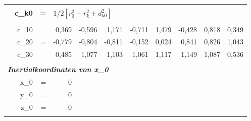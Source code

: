 \begin{table}[ht]
\begin{tabular}{r|rrr|r|r|r|r|rrr}
    \multicolumn{1}{r}{} &       &       & \multicolumn{1}{r}{} & \multicolumn{1}{r}{} & \multicolumn{1}{r}{} & \multicolumn{1}{r}{} & \multicolumn{1}{r}{} &       &       &  \\
    \multicolumn{1}{r}{} & \textbf{c\_k0} & \textbf{=} & \multicolumn{8}{l}{$1/2[r_0^2-r_k^2+d_{k0}^2]$} \\
    \multicolumn{1}{r}{} &       &       & \multicolumn{1}{r}{\textbf{}} & \multicolumn{1}{r}{\textbf{}} & \multicolumn{1}{r}{\textbf{}} & \multicolumn{1}{r}{\textbf{}} & \multicolumn{1}{r}{\textbf{}} & \textbf{} & \textbf{} & \textbf{} \\
    \multicolumn{1}{r}{} & c\_10 &       & \multicolumn{1}{r}{0,369} & \multicolumn{1}{r}{-0,596} & \multicolumn{1}{r}{1,171} & \multicolumn{1}{r}{-0,711} & \multicolumn{1}{r}{1,479} & -0,428 & 0,818 & 0,349 \\
    \multicolumn{1}{r}{} & c\_20 & =     & \multicolumn{1}{r}{-0,779} & \multicolumn{1}{r}{-0,804} & \multicolumn{1}{r}{-0,811} & \multicolumn{1}{r}{-0,152} & \multicolumn{1}{r}{0,024} & 0,841 & 0,826 & 1,043 \\
    \multicolumn{1}{r}{} & c\_30 &       & \multicolumn{1}{r}{0,485} & \multicolumn{1}{r}{1,077} & \multicolumn{1}{r}{1,103} & \multicolumn{1}{r}{1,061} & \multicolumn{1}{r}{1,117} & 1,149 & 1,087 & 0,536 \\
    \multicolumn{1}{r}{} &       &       & \multicolumn{1}{r}{} & \multicolumn{1}{r}{} & \multicolumn{1}{r}{} & \multicolumn{1}{r}{} & \multicolumn{1}{r}{} &       &       &  \\
    \multicolumn{11}{l}{\textit{\textbf{Inertialkoordinaten von x\_0}}} \\
    \multicolumn{1}{r}{} & x\_0  & =     & \multicolumn{1}{r}{0} & \multicolumn{1}{r}{} & \multicolumn{1}{r}{} & \multicolumn{1}{r}{} & \multicolumn{1}{r}{} &       &       &  \\
    \multicolumn{1}{r}{} & y\_0  & =     & \multicolumn{1}{r}{0} & \multicolumn{1}{r}{} & \multicolumn{1}{r}{} & \multicolumn{1}{r}{} & \multicolumn{1}{r}{} &       &       &  \\
    \multicolumn{1}{r}{} & z\_0  & =     & \multicolumn{1}{r}{0} & \multicolumn{1}{r}{} & \multicolumn{1}{r}{} & \multicolumn{1}{r}{} & \multicolumn{1}{r}{} &       &       &  \\
    \multicolumn{1}{r}{} &       &       & \multicolumn{1}{r}{} & \multicolumn{1}{r}{} & \multicolumn{1}{r}{} & \multicolumn{1}{r}{} & \multicolumn{1}{r}{} &       &       &  \\

\end{tabular}
\end{table}
